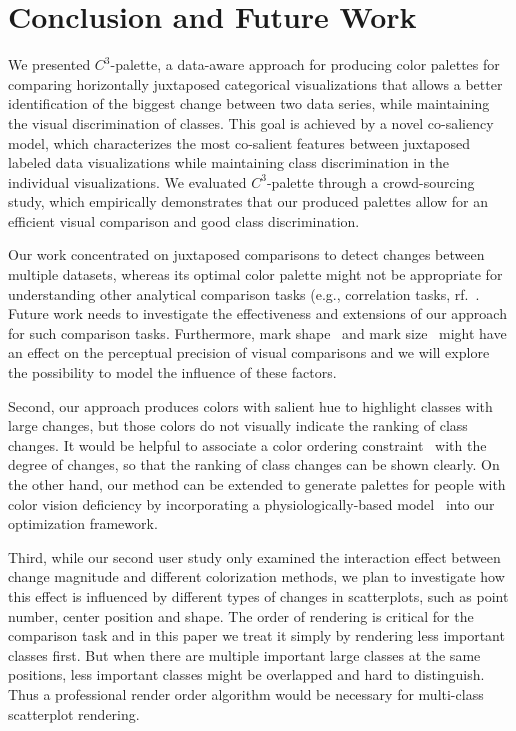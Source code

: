 \section {Conclusion and Future Work}
We presented $C^3$-palette, a data-aware approach for producing color
palettes for comparing horizontally juxtaposed categorical visualizations that allows a better identification of the biggest change between two data series, while maintaining the visual discrimination of classes. This goal is
achieved by a  novel co-saliency model, which characterizes the most co-salient features between juxtaposed labeled data visualizations while maintaining class discrimination in the individual visualizations. We evaluated $C^3$-palette through a crowd-sourcing study, which empirically demonstrates that our produced
palettes allow for an efficient visual comparison and good class discrimination.

Our work concentrated on juxtaposed comparisons to detect changes between multiple datasets, whereas its optimal color palette might not be appropriate for understanding other analytical comparison tasks (e.g., correlation tasks, rf.~\cite{Ondov19}. Future work needs to investigate the effectiveness and extensions of our approach for such comparison tasks. Furthermore, mark shape~\cite{liu2021data} and mark size~\cite{smart2019measuring}  might have an effect on the perceptual precision of visual comparisons and we will explore the possibility to model the influence of these factors. %


Second, our approach produces colors with salient hue to highlight classes with large changes, but those colors do not visually indicate the ranking of class changes. It would be helpful to associate a color ordering constraint~\cite{Bujack18} with the degree of changes, so that the ranking of class changes can be shown clearly. On the other hand, our method can be extended to generate palettes for people with color vision deficiency by incorporating a physiologically-based model~\cite{machado2009physiologically} into our optimization framework.

Third, while our second user study only examined the interaction effect between change magnitude and different colorization methods, we plan to investigate how this effect is influenced by different types of changes in scatterplots, such as point number, center position and shape.
The order of rendering is critical for the comparison task and in this paper we treat it simply by rendering less important classes first. But when there are multiple important large classes at the same positions, less important classes might be overlapped and hard to distinguish. Thus a professional render order algorithm would be necessary for multi-class scatterplot rendering.

